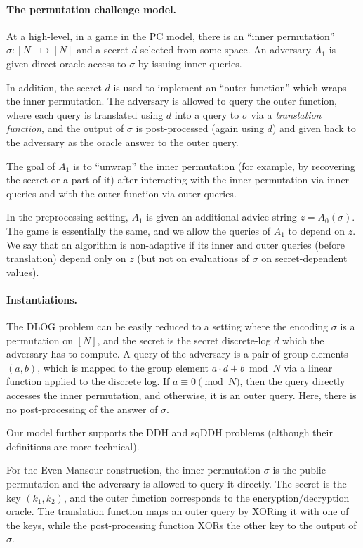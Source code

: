 \documentclass[11pt]{article}
\newcommand{\secv}{{d}}
\begin{document}
\paragraph{The permutation challenge model.} At a high-level, in a game in the PC model, there is an ``inner permutation'' 
$\sigma:[N] \mapsto [N]$ and a secret $\secv$ selected from some space.
An adversary $A_1$ is given direct oracle access to $\sigma$ by issuing inner queries. 

In addition, the secret $\secv$ is used to implement an ``outer function'' which wraps the inner permutation. The adversary is allowed to query the outer function, where each query is translated using $\secv$ into a query to $\sigma$ via a \emph{translation function}, and the output of $\sigma$ is post-processed (again using $\secv$) and given back to the adversary as the oracle answer to the outer query.

The goal of $A_1$ is to ``unwrap'' the inner permutation (for example, by recovering the secret or a part of it) after interacting with the inner permutation via inner queries and with the outer function via outer queries. 

In the preprocessing setting, $A_1$ is given an additional advice string $z = A_0(\sigma)$. The game is essentially the same, and we allow the queries of $A_1$ to depend on $z$. We say that an algorithm is non-adaptive if its inner and outer queries (before translation) depend only on $z$ 
(but not on evaluations of $\sigma$ on secret-dependent values).

\paragraph{Instantiations.}
The DLOG problem can be easily reduced to a setting where the encoding $\sigma$ is a permutation on $[N]$, and the secret is the secret discrete-log $d$ which the adversary has to compute. A query of the adversary is a pair of group elements $(a,b)$, which is mapped to the group element $a \cdot d + b \bmod N$ via a linear function applied to the discrete log. 
If $a \equiv 0 \pmod N$, then the query directly accesses the inner permutation, and otherwise, it is an outer query. Here, there is no post-processing of the answer of $\sigma$.

Our model further supports the DDH and sqDDH problems (although their definitions are more technical).

For the Even-Mansour construction, the inner permutation $\sigma$ is the public permutation and the adversary is allowed to query it directly. 
The secret is the key $(k_1,k_2)$, and 
the outer function corresponds to the encryption/decryption oracle. The translation function maps an outer query by XORing it with one of the keys, while the post-processing function XORs the other key to the output of $\sigma$.
\end{document}
